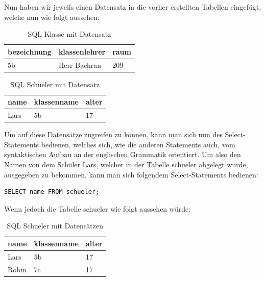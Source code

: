 \documentclass[12pt,a4paper,bibliography=totocnumbered,listof=totocnumbered]{scrartcl}
\begin{document}
Nun haben wir jeweils einen Datensatz in die vorher erstellten Tabellen eingefügt, welche nun wie folgt aussehen:
\vspace{1em}
\begin{table}[!h]
	\centering
	\begin{tabular}{|l|l|l|}
		\hline
		\textbf{bezeichnung} & \textbf{klassenlehrer} & \textbf{raum}\\
		\hline
		5b & Herr Bachran & 209\\
		
	\end{tabular}
	\caption{SQL Klasse mit Datensatz}
	\label{tab:sql-klasse2}
\end{table}
\vspace{1em}
\begin{table}[!h]
	\centering
	\begin{tabular}{|l|l|l|}
		\hline
		\textbf{name} & \textbf{klassenname} & \textbf{alter}\\
		\hline
		Lars & 5b & 17\\
		
	\end{tabular}
	\caption{SQL Schueler mit Datensatz}
	\label{tab:sql-schueler2}
\end{table}

\pagebreak
Um auf diese Datensätze zugreifen zu können, kann man sich nun des \glqq Select-Statements\grqq{} bedienen, welches sich, wie die anderen Statements auch, vom syntaktischen Aufbau an der englischen Grammatik orientiert.
Um also den Namen von dem Schüler \glqq Lars\grqq, welcher in der Tabelle \glqq schueler\grqq{} abgelegt wurde, ausgegeben zu bekommen, kann man sich folgendem \glqq Select-Statements\grqq{} bedienen:


\vspace{1em}
\begin{lstlisting}[caption= SQL Select Name, label=lst:sql-select-name]
SELECT name FROM schueler;
\end{lstlisting}

Wenn jedoch die Tabelle \glqq schueler\grqq{} wie folgt aussehen würde:

\vspace{1em}
\begin{table}[!h]
	\centering
	\begin{tabular}{|l|l|l|}
		\hline
		\textbf{name} & \textbf{klassenname} & \textbf{alter}\\
		\hline
		Lars & 5b & 17\\
		\hline
		Robin & 7c & 17\\
		
	\end{tabular}
	\caption{SQL Schueler mit Datensätzen}
	\label{tab:sql-schueler3}
\end{table}
\end{document}
